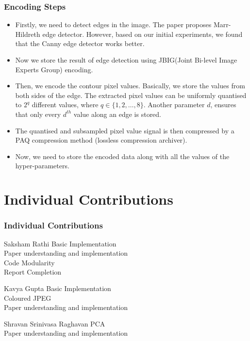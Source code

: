 \documentclass[Serif, 10pt, brown]{beamer}
\theoremstyle{example}
\theoremstyle{plain}
\begin{document}
\begin{frame}
	\frametitle{Encoding Steps}
	\begin{itemize}
		\item Firstly, we need to detect edges in the image. The paper proposes Marr-Hildreth edge detector. However, based on our initial experiments, we found that the Canny edge detector works better.
		\item Now we store the result of edge detection using JBIG(Joint Bi-level Image Experts Group) encoding.
		\item Then, we encode the contour pixel values. Basically, we store the
		values from both sides of the edge. The extracted pixel values can be uniformly quantised to $2^q$ diﬀerent values,
		where $q \in \{1, 2, \dots, 8\}$. Another parameter $d$, ensures that only every $d^{th}$ value along an edge is stored.
		\item The quantised and subsampled pixel value signal is then compressed by a PAQ compression method (lossless compression archiver).
		\item Now, we need to store the encoded data along with all the values of the hyper-parameters.
	\end{itemize}
\end{frame}





\section{Individual Contributions}

\begin{frame}
	\frametitle{Individual Contributions}
	\begin{alertblock}{Saksham Rathi}
		Basic Implementation\\
		Paper understanding and implementation\\
		Code Modularity\\
		Report Completion
	\end{alertblock}
	\begin{alertblock}{Kavya Gupta}
		Basic Implementation\\
		Coloured JPEG\\
		Paper understanding and implementation
	\end{alertblock}
	\begin{alertblock}{Shravan Srinivasa Raghavan}
		PCA\\
		Paper understanding and implementation
	\end{alertblock}

\end{frame}
\end{document}

